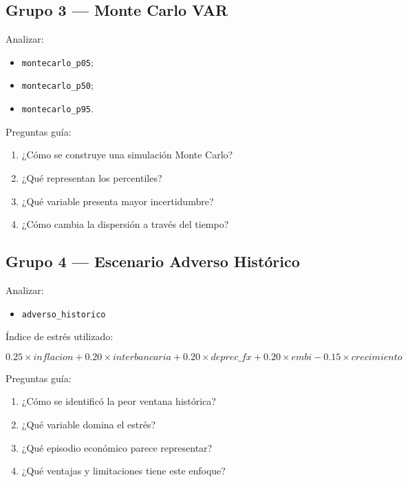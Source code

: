 \documentclass[12pt]{article}
\begin{document}
\subsection*{Grupo 3 — Monte Carlo VAR}

Analizar:

\begin{itemize}
    \item \texttt{montecarlo\_p05};
    \item \texttt{montecarlo\_p50};
    \item \texttt{montecarlo\_p95}.
\end{itemize}

Preguntas guía:

\begin{enumerate}
    \item ¿Cómo se construye una simulación Monte Carlo?
    \item ¿Qué representan los percentiles?
    \item ¿Qué variable presenta mayor incertidumbre?
    \item ¿Cómo cambia la dispersión a través del tiempo?
\end{enumerate}


\subsection*{Grupo 4 — Escenario Adverso Histórico}

Analizar:

\begin{itemize}
    \item \texttt{adverso\_historico}
\end{itemize}

Índice de estrés utilizado:

\[
0.25 \times inflacion +
0.20 \times interbancaria +
0.20 \times deprec\_fx +
0.20 \times embi -
0.15 \times crecimiento
\]

Preguntas guía:

\begin{enumerate}
    \item ¿Cómo se identificó la peor ventana histórica?
    \item ¿Qué variable domina el estrés?
    \item ¿Qué episodio económico parece representar?
    \item ¿Qué ventajas y limitaciones tiene este enfoque?
\end{enumerate}
\end{document}
